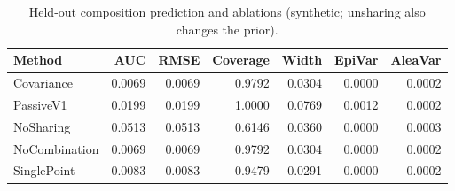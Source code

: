 \begin{table}[t]
\caption{Held-out composition prediction and ablations (synthetic; unsharing also changes the prior).}
\label{tab:experiment3}
\begin{tabular}{lrrrrrr}
\toprule
Method & AUC & RMSE & Coverage & Width & EpiVar & AleaVar \\
\midrule
Covariance & 0.0069 & 0.0069 & 0.9792 & 0.0304 & 0.0000 & 0.0002 \\
PassiveV1 & 0.0199 & 0.0199 & 1.0000 & 0.0769 & 0.0012 & 0.0002 \\
NoSharing & 0.0513 & 0.0513 & 0.6146 & 0.0360 & 0.0000 & 0.0003 \\
NoCombination & 0.0069 & 0.0069 & 0.9792 & 0.0304 & 0.0000 & 0.0002 \\
SinglePoint & 0.0083 & 0.0083 & 0.9479 & 0.0291 & 0.0000 & 0.0002 \\
\bottomrule
\end{tabular}
\end{table}
